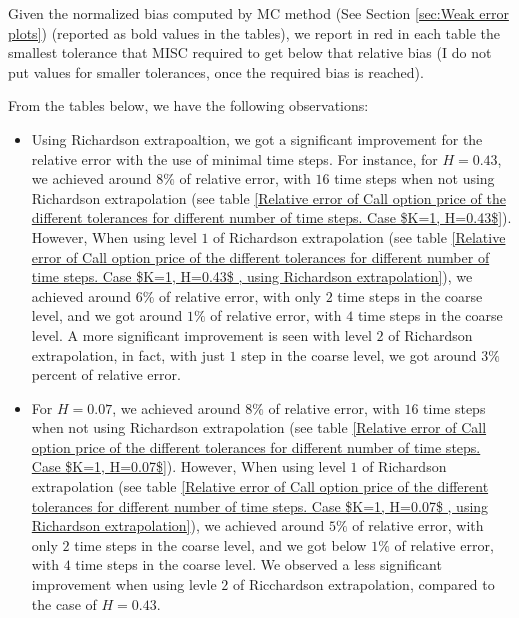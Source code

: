 \documentclass[11pt]{article}
\begin{document}
Given the normalized bias computed by MC method (See Section \ref{sec:Weak error plots}) (reported as bold values in the tables), we report in red in each table the smallest tolerance that MISC required to get below that relative bias (I do not put values for smaller tolerances, once the required bias is reached).


From the tables below, we have the following observations:

\begin{itemize}
	\item Using Richardson extrapoaltion, we got a significant improvement for the relative error with the use of minimal time steps. For instance, for $H=0.43$, we achieved around $8\%$ of  relative error, with $16$ time steps when not using Richardson extrapolation (see table \ref{Relative error of Call option price of the different tolerances for different number of time steps. Case $K=1, H=0.43$}). However, When using level $1$ of Richardson extrapolation (see table \ref{Relative error of Call option price of the different tolerances for different number of time steps. Case $K=1, H=0.43$ , using Richardson extrapolation}),  we achieved around $6\%$ of  relative error, with  only $2$ time steps in the coarse level, and we got around  $1\%$ of  relative error, with   $4$ time steps in the coarse level. A more significant improvement is seen with level $2$ of Richardson extrapolation, in fact, with just $1$ step in the coarse level, we got around $3\%$ percent of relative error.
	\item For $H=0.07$, we achieved around $8\%$ of  relative error, with $16$ time steps when not using Richardson extrapolation (see table \ref{Relative error of Call option price of the different tolerances for different number of time steps. Case $K=1, H=0.07$}). However, When using level $1$ of Richardson extrapolation (see table \ref{Relative error of Call option price of the different tolerances for different number of time steps. Case $K=1, H=0.07$ , using Richardson extrapolation}),  we achieved around $5\%$ of  relative error, with  only $2$ time steps in the coarse level, and we got below  $1\%$ of  relative error, with   $4$ time steps in the coarse level. We observed a less significant improvement when using levle $2$ of Ricchardson extrapolation, compared to the case of $H=0.43$.
	
\end{itemize}
\end{document}

